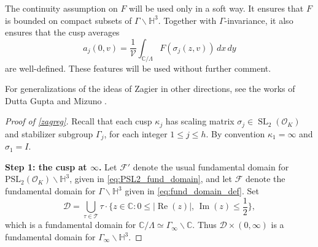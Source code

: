 \documentclass[12pt,reqno]{amsart}
\numberwithin{equation}{section}
\renewcommand{\Im}{\operatorname{Im}}
\renewcommand{\Re}{\operatorname{Re}}
\newcommand{\C}{\mathbb{C}}
\begin{document}
\begin{remark}
The continuity assumption on $F$ will be used only in a soft way. It ensures that $F$ is bounded on compact subsets of $\Gamma\backslash \mathbb H^3$.
Together with $\Gamma$-invariance, it also ensures
that the cusp averages
\begin{equation*}
a_j(0,v)=\frac{1}{\mathcal{V}}\int_{\mathbb C/\Lambda} F(\sigma_j(z,v)) \, dx \, dy
\end{equation*}
are well-defined. These features will be used without further comment.
\end{remark}

For generalizations of the ideas of Zagier \cite{Zag} in other directions, see the works of Dutta Gupta \cite{DG} and Mizuno \cite{Miz}.
 
\begin{proof}[Proof of \cref{zagreg}]

Recall that each cusp $\kappa_j$ has scaling matrix $\sigma_{j} \in \operatorname{SL}_2(\mathcal{O}_{K})$ and stabilizer subgroup $\Gamma_{j}$, for each integer $1 \leq j \leq h$. By convention $\kappa_1=\infty$ and $\sigma_{1}=I$.


\medskip
\noindent\textbf{Step 1: the cusp at $\infty$.} Let $\mathcal{F}'$ denote the usual fundamental domain for $\mathrm{PSL}_2(\mathcal{O}_K)\backslash \mathbb{H}^3$, given in \eqref{eq:PSL2_fund_domain}, and let $\mathcal{F}$ denote the fundamental domain for $\Gamma \backslash \mathbb{H}^3$ given in \eqref{eq:fund_domain_def}. Set
\begin{equation*}
    \mathcal{D} = \bigcup_{\tau \in \mathcal{T}} \tau \cdot \Big\{ z \in \C : 0 \leq |{\Re(z)}|, \, \Im(z) \leq \frac{1}{2} \Big\}, 
\end{equation*}
which is a fundamental domain for $\mathbb{C}/\Lambda \simeq \Gamma_\infty\backslash\C$.  Thus $\mathcal{D} \times (0, \infty)$ is a fundamental domain for $\Gamma_\infty\backslash\mathbb{H}^3$. 


\end{proof}
\end{document}
